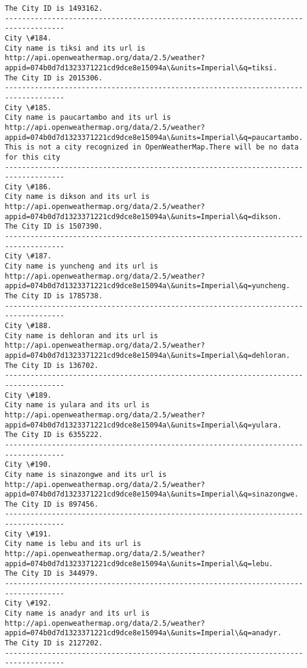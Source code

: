 \documentclass[11pt]{article}
\begin{document}
\begin{Verbatim}[commandchars=\\\{\}]
The City ID is 1493162.
------------------------------------------------------------------------------------
City \#184.
City name is tiksi and its url is http://api.openweathermap.org/data/2.5/weather?appid=074b0d7d1323371221cd9dce8e15094a\&units=Imperial\&q=tiksi.
The City ID is 2015306.
------------------------------------------------------------------------------------
City \#185.
City name is paucartambo and its url is http://api.openweathermap.org/data/2.5/weather?appid=074b0d7d1323371221cd9dce8e15094a\&units=Imperial\&q=paucartambo.
This is not a city recognized in OpenWeatherMap.There will be no data for this city
------------------------------------------------------------------------------------
City \#186.
City name is dikson and its url is http://api.openweathermap.org/data/2.5/weather?appid=074b0d7d1323371221cd9dce8e15094a\&units=Imperial\&q=dikson.
The City ID is 1507390.
------------------------------------------------------------------------------------
City \#187.
City name is yuncheng and its url is http://api.openweathermap.org/data/2.5/weather?appid=074b0d7d1323371221cd9dce8e15094a\&units=Imperial\&q=yuncheng.
The City ID is 1785738.
------------------------------------------------------------------------------------
City \#188.
City name is dehloran and its url is http://api.openweathermap.org/data/2.5/weather?appid=074b0d7d1323371221cd9dce8e15094a\&units=Imperial\&q=dehloran.
The City ID is 136702.
------------------------------------------------------------------------------------
City \#189.
City name is yulara and its url is http://api.openweathermap.org/data/2.5/weather?appid=074b0d7d1323371221cd9dce8e15094a\&units=Imperial\&q=yulara.
The City ID is 6355222.
------------------------------------------------------------------------------------
City \#190.
City name is sinazongwe and its url is http://api.openweathermap.org/data/2.5/weather?appid=074b0d7d1323371221cd9dce8e15094a\&units=Imperial\&q=sinazongwe.
The City ID is 897456.
------------------------------------------------------------------------------------
City \#191.
City name is lebu and its url is http://api.openweathermap.org/data/2.5/weather?appid=074b0d7d1323371221cd9dce8e15094a\&units=Imperial\&q=lebu.
The City ID is 344979.
------------------------------------------------------------------------------------
City \#192.
City name is anadyr and its url is http://api.openweathermap.org/data/2.5/weather?appid=074b0d7d1323371221cd9dce8e15094a\&units=Imperial\&q=anadyr.
The City ID is 2127202.
------------------------------------------------------------------------------------

\end{Verbatim}
\end{document}

